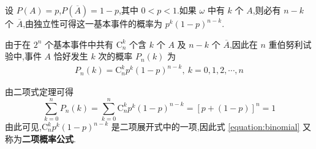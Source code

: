 设 $P(A)=p$,$P(\overline{A}) = 1-p$,其中 $0<p<1$.如果 $\omega$ 中有 $k$ 个 $A$,则必有 $n-k$ 个 $\overline{A}$,由独立性可得这一基本事件的概率为 $p^k (1-p)^{n-k}$.

由于在 $2^n$ 个基本事件中共有 $\mathrm{C}_n^k$ 个含 $k$ 个 $A$ 及 $n-k$ 个 $\overline{A}$,因此在 $n$ 重伯努利试验中,事件 $A$ 恰好发生 $k$ 次的概率 $P_n(k)$ 为
\begin{gather} \label{equation:binomial}
    P_n(k)=\mathrm{C}_n^k p^k (1-p)^{n-k}, \ k=0,1,2,\cdots,n
\end{gather}

由二项式定理可得
$$
\sum_{k=0}^n P_n(k) = \sum_{k=0}^n \mathrm{C}_n^k p^k (1-p)^{n-k} = [p+(1-p)]^n = 1
$$
由此可见,$\mathrm{C}_n^k p^k (1-p)^{n-k}$ 是二项展开式中的一项,因此式 \eqref{equation:binomial} 又称为\textbf{二项概率公式}.